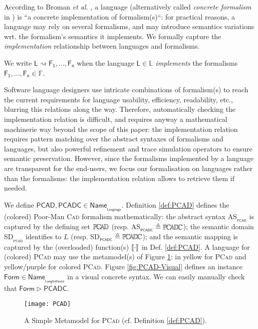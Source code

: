 According to Broman \emph{et al.} \cite{Broman-etAl:2012}, a language 
(alternatively called \emph{concrete formalism} in \cite{P:MPM:2006}) is ``a 
concrete implementation of formalism(s)``: 
for practical reasons, a language may rely on several 
formalisms, and may introduce semantics variations wrt. the formalism's 
semantics it implements. We formally capture the \emph{implementation} 
relationship between languages and formalisms.

\begin{Definition}
   We write $\mathsf{L} \rightsquigarrow \mathsf{F_1}, \ldots, \mathsf{F_n}$ 
when the language $\mathsf{L}\in\mathbb{L}$ \emph{implements} the formalisms 
$\mathsf{F_1}, \ldots, \mathsf{F_n}\in\mathbb{F}$.
\end{Definition}
\noindent
Software language designers use intricate combinations of formalism(s) to reach 
the current requirements for language usability, efficiency, readability, etc., 
blurring this relations along the way. 
Therefore, automatically checking the implementation relation is difficult, and 
requires anyway a mathematical machinerie way beyond the scope of this paper: 
the implementation relation requires pattern matching over the abstract 
syntaxes of formalisms and languages, but also powerful refinement and 
trace simulation operators to ensure semantic preservation. 
However, since the formalisms implemented by a language are transparent for the 
end-users, we focus our formalisation on languages rather than the formalisms: 
the implementation relation allows to retrieve them if needed.

\begin{Example}
      We define $\mathsf{PCAD, PCADC} \in 
\mathsf{Name}_{_{\mathsf{Language}}}$. Definition \ref{def:PCAD} defines the 
(colored) Poor-Man \textsc{Cad} formalism mathematically: the abstract syntax 
\textsf{AS}$_{_{\mathsf{PCAD}}}$ is captured by the defining set $\mathbb{P}\!\mathbb{C}\!\mathbb{A}\!\mathbb{D} $ (resp. 
\textsf{AS}$_{_{\mathsf{PCADC}}} \triangleq \mathbb{P}\!\mathbb{C}\!\mathbb{A}\!\mathbb{D} \!\mathbb{C} $); the semantic domain 
\textsf{SD}$_{_{\mathsf{PCAD}}}$ identifies to $L$ (resp. 
\textsf{SD}$_{_{\mathsf{PCADC}}} \triangleq \mathbb{P}\!\mathbb{C}\!\mathbb{A}\!\mathbb{D} \!\mathbb{C} $); and the semantic mapping is 
captured by the (overloaded) function(s) $\llbracket \cdot \rrbracket$ in Def. \ref{def:PCAD}. A 
language for (colored) \textsc{PCad} may use the metamodel(s) of Figure 
\ref{fig:PCAD-MM}: in yellow for \textsc{PCad} and yellow/purple for colored 
\textsc{PCad}. Figure \ref{fig:PCAD-Visual} defines an instance 
$\mathsf{Form}\in\mathsf{Name}_{_{\mathsf{LangInstance}}}$ in a visual concrete 
syntax. We can easily manually check that $\mathsf{Form}\rhd \mathsf{PCADC}$.

\begin{figure}[t]
   \centering
   \texttt{[image: PCAD]}
   \caption{A Simple Metamodel for \textsc{PCad} (cf. Definition 
\ref{def:PCAD}).}%
   \label{fig:PCAD-MM}%
\end{figure}

\end{Example}



